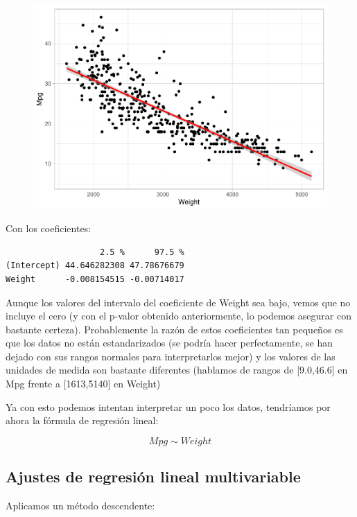 \begin{figure}[H]\center\includegraphics[width=.85\linewidth]{img/Regresion_files/figure-latex/unnamed-chunk-6-1} \caption{}\end{figure}

Con los coeficientes:

\begin{verbatim}
                   2.5 %      97.5 %
(Intercept) 44.646282308 47.78676679
Weight      -0.008154515 -0.00714017
\end{verbatim}

Aunque los valores del intervalo del coeficiente de Weight sea bajo, vemos que no incluye el cero (y con el p-valor obtenido anteriormente, lo podemos asegurar con bastante certeza). Probablemente la razón de estos coeficientes tan pequeños es que los datos no están estandarizados (se podría hacer perfectamente, se han dejado con sus rangos normales para interpretarlos mejor) y los valores de las unidades de medida son bastante diferentes (hablamos de rangos de {[}9.0,46.6{]} en Mpg frente a {[}1613,5140{]} en Weight)

\vspace{\baselineskip}

Ya con esto podemos intentan interpretar un poco los datos, tendríamos por ahora la fórmula de regresión lineal: 

\begin{equation}    
    Mpg \sim Weight
\end{equation}

\subsection{Ajustes de regresión lineal multivariable}

Aplicamos un método descendente:

